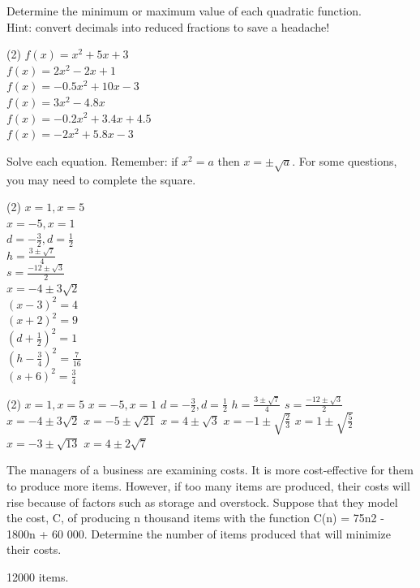 \documentclass[12pt,fleqn]{book}
\newcommand{\prb}[1]{\begin{Exercise}#1\end{Exercise}}
\newcommand{\sol}[1]{\begin{Answer}#1\end{Answer}}
\begin{document}
\prb{Determine the minimum or maximum value of each quadratic function.  \\ Hint: convert decimals into reduced fractions to save a headache!
	\begin{tasks}(2)
		\task $f(x)=x^2+5 x+3$
		\\[10em]
		\task $f(x)=2 x^2-2 x+1$
		\\[10em]
		\task $f(x)=-0.5 x^2+10 x-3$
		\\[10em]
		\task $f(x)=3 x^2-4.8 x$
		\\[10em]
		\task $f(x)=-0.2 x^2+3.4 x+4.5$
		\\[10em]
		\task $f(x)=-2 x^2+5.8 x-3$
		\\[10em]
	\end{tasks}
}

\prb{Solve each equation.  Remember: if $x^2=a$ then $x=\pm \sqrt a$.  For some questions, you may need to complete the square.
	\begin{tasks}(2)
		\task $x=1, x=5$
		\\[5em]
		\task $x=-5, x=1$
		\\[5em]
		\task $d=-\frac{3}{2}, d=\frac{1}{2}$
		\\[5em]
		\task $h=\frac{3 \pm \sqrt{7}}{4}$
		\\[5em]
		\task $s=\frac{-12 \pm \sqrt{3}}{2}$
		\\[5em]
		\task $x=-4 \pm 3 \sqrt{2}$
		\\[5em]
		\task $(x-3)^2=4$
		\\[5em]
		\task $(x+2)^2=9$
		\\[5em]
		\task $\left(d+\frac{1}{2}\right)^2=1$
		\\[5em]
		\task $\left(h-\frac{3}{4}\right)^2=\frac{7}{16}$
		\\[5em]
		\task $(s+6)^2=\frac{3}{4}$
		\\[5em]
	\end{tasks}
}
\sol{
	\begin{tasks}(2)
		\task $x=1, x=5$
		\task $x=-5, x=1$
		\task $d=-\frac{3}{2}, d=\frac{1}{2}$
		\task $h=\frac{3 \pm \sqrt{7}}{4}$
		\task $s=\frac{-12 \pm \sqrt{3}}{2}$
		\task $x=-4 \pm 3 \sqrt{2}$
		\task $x=-5 \pm \sqrt{21}$
		\task $x=4 \pm \sqrt{3}$
		\task $x=-1 \pm \sqrt{\frac{2}{3}}$
		\task $x=1 \pm \sqrt{\frac{5}{2}}$
		\task $x=-3 \pm \sqrt{13}$
		\task $x=4 \pm 2 \sqrt{7}$
	\end{tasks}
}

\prb{The managers of a business are examining
	costs. It is more cost-effective for them
	to produce more items. However, if too
	many items are produced, their costs
	will rise because of factors such as
	storage and overstock. Suppose that
	they model the cost, C, of producing
	n thousand items with the function
	C(n) = 75n2 - 1800n + 60 000.
	Determine the number of items
	produced that will minimize their costs.\\[2in]}
\sol{12000 items.}
\end{document}
